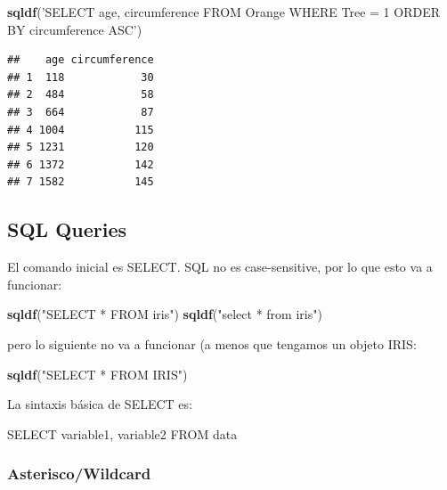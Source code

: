 \documentclass[]{book}
\newenvironment{Shaded}{\begin{snugshade}}{\end{snugshade}}
\newcommand{\KeywordTok}[1]{\textcolor[rgb]{0.13,0.29,0.53}{\textbf{#1}}}
\newcommand{\NormalTok}[1]{#1}
\newcommand{\StringTok}[1]{\textcolor[rgb]{0.31,0.60,0.02}{#1}}
\begin{document}
\begin{Shaded}
\begin{Highlighting}[]
\KeywordTok{sqldf}\NormalTok{(}\StringTok{'SELECT age, circumference FROM Orange WHERE Tree = 1 ORDER BY circumference ASC'}\NormalTok{)}
\end{Highlighting}
\end{Shaded}

\begin{verbatim}
##    age circumference
## 1  118            30
## 2  484            58
## 3  664            87
## 4 1004           115
## 5 1231           120
## 6 1372           142
## 7 1582           145
\end{verbatim}

\hypertarget{sql-queries}{%
\subsection{SQL Queries}\label{sql-queries}}

El comando inicial es SELECT. SQL no es case-sensitive, por lo que esto va a funcionar:

\begin{Shaded}
\begin{Highlighting}[]
\KeywordTok{sqldf}\NormalTok{(}\StringTok{"SELECT * FROM iris"}\NormalTok{)}
\KeywordTok{sqldf}\NormalTok{(}\StringTok{"select * from iris"}\NormalTok{)}
\end{Highlighting}
\end{Shaded}

pero lo siguiente no va a funcionar (a menos que tengamos un objeto IRIS:

\begin{Shaded}
\begin{Highlighting}[]
\KeywordTok{sqldf}\NormalTok{(}\StringTok{"SELECT * FROM IRIS"}\NormalTok{)}
\end{Highlighting}
\end{Shaded}

La sintaxis básica de SELECT es:

\begin{Shaded}
\begin{Highlighting}[]
\NormalTok{SELECT variable1, variable2 FROM data}
\end{Highlighting}
\end{Shaded}

\hypertarget{asteriscowildcard}{%
\subsubsection{Asterisco/Wildcard}\label{asteriscowildcard}}
\end{document}
